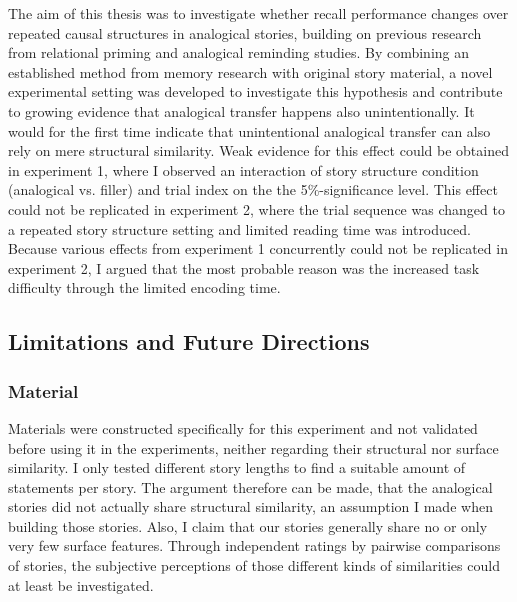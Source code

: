 \documentclass[a4paper,man,natbib,floatsintext,import]{apa6}
\begin{document}

The aim of this thesis was to investigate whether recall performance changes over repeated causal structures in analogical stories, building on previous research from relational priming and analogical reminding studies. By combining an established method from memory research with original story material, a novel experimental setting was developed to investigate this hypothesis and contribute to growing evidence that analogical transfer happens also unintentionally. It would for the first time indicate that unintentional analogical transfer can also rely on mere structural similarity. Weak evidence for this effect could be obtained in experiment 1, where I observed an interaction of story structure condition (analogical vs. filler) and trial index on the the 5\%-significance level. This effect could not be replicated in experiment 2, where the trial sequence was changed to a repeated story structure setting and limited reading time was introduced. Because various effects from experiment 1 concurrently could not be replicated in experiment 2, I argued that the most probable reason was the increased task difficulty through the limited encoding time.

\subsection{Limitations and Future Directions}
\subsubsection{Material}
Materials were constructed specifically for this experiment and not validated before using it in the experiments, neither regarding their structural nor surface similarity. I only tested different story lengths to find a suitable amount of statements per story. The argument therefore can be made, that the analogical stories did not actually share structural similarity, an assumption I made when building those stories. Also, I claim that our stories generally share no or only very few surface features. Through independent ratings by pairwise comparisons of stories, the subjective perceptions of those different kinds of similarities could at least be investigated.
\end{document}
